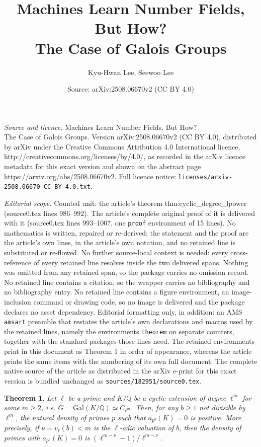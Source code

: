 \documentclass[10pt,a4paper]{amsart}
\title{Machines Learn Number Fields, But How? \\ The Case of Galois Groups}
\author{Kyu-Hwan Lee, Seewoo Lee}
\date{Source: arXiv:2508.06670v2 (CC BY 4.0)}
\newtheorem{theorem}{Theorem}
\newcommand{\Gal}{\mathrm{Gal}}
\newcommand{\bQ}{\mathbb{Q}}
\begin{document}
\maketitle

\noindent\emph{Source and licence.} Machines Learn Number Fields, But How? \\ The Case of Galois Groups. Version arXiv:2508.06670v2 (CC BY 4.0), distributed by arXiv under the Creative Commons Attribution 4.0 International licence, http://creativecommons.org/licenses/by/4.0/, as recorded in the arXiv licence metadata for this exact version and shown on the abstract page https://arxiv.org/abs/2508.06670v2. Full licence notice: \texttt{licenses/arxiv-2508.06670-CC-BY-4.0.txt}.\par\smallskip

\noindent\textit{Editorial scope.} Counted unit: the article's theorem thm:cyclic\_degree\_lpower (source0.tex lines 986--992). The article's complete original proof of it is delivered with it (source0.tex lines 993--1007, one \texttt{proof} environment of 15 lines). No mathematics is written, repaired or re-derived: the statement and the proof are the article's own lines, in the article's own notation, and no retained line is substituted or re-flowed.  No further source-local context is needed: every cross-reference of every retained line resolves inside the two delivered spans.  Nothing was omitted from any retained span, so the package carries no omission record.  No retained line contains a citation, so the wrapper carries no bibliography and no bibliography entry.  No retained line contains a figure environment, an image-inclusion command or drawing code, so no image is delivered and the package declares no asset dependency.  Editorial formatting only, in addition: an AMS \texttt{amsart} preamble that restates the article's own declarations and macros used by the retained lines, namely the environments \texttt{theorem} on separate counters, together with the standard packages those lines need.  The retained environments print in this document as Theorem 1 in order of appearance, whereas the article prints the same items with the numbering of its own full document.  The complete native source of the article as distributed in the arXiv e-print for this exact version is bundled unchanged as \texttt{sources/182951/source0.tex}.
\begin{theorem}
    \label{thm:cyclic_degree_lpower}
    Let $\ell$ be a prime and $K / \bQ$ be a cyclic extension of degree $\ell^m$ for some $m \ge 2$, i.e. $G = \Gal(K / \bQ) \simeq C_{\ell^m}$.
     Then, for any $b \ge 1$ not divisible by $\ell^m$, the natural density of primes $p$ such that $a_{p^b}(K) = 0$ is positive. More precisely, if $\nu = v_\ell(b) < m$ is the $\ell$-adic valuation of $b$, then the density of primes with $a_{p^b}(K) = 0$ is $(\ell^{m - \nu} - 1) / \ell^{m - \nu}$.
    
\end{theorem}
\end{document}

